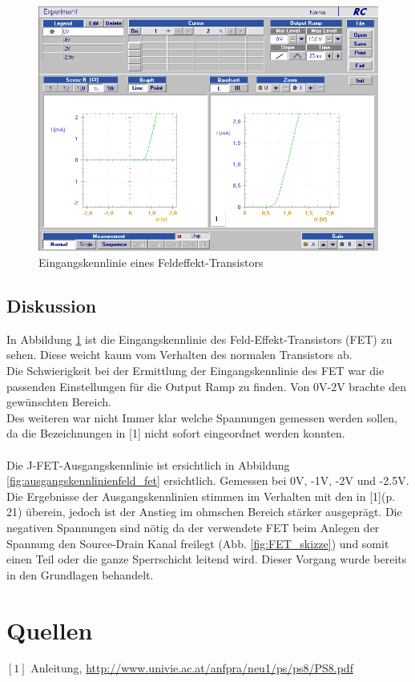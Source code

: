 \documentclass[12pt,a4paper]{article}
\begin{document}
\begin{figure}[H]
	\centering
	\includegraphics[scale=0.45]{./data/Braun_Kurz_PS8/FET_Eingangskennlinie.png}
	\caption{Eingangskennlinie eines Feldeffekt-Transistors}
	\label{fig:eingangskennlinien_fet}
\end{figure}

\begin{multicols}{2}

\subsection{Diskussion}
In Abbildung \ref{fig:eingangskennlinien_fet} ist die Eingangskennlinie des Feld-Effekt-Transistors (FET) zu sehen.
Diese weicht kaum vom Verhalten des normalen Transistors ab.\\
Die Schwierigkeit bei der Ermittlung der Eingangskennlinie des FET war die passenden Einstellungen für die Output Ramp zu finden. Von 0V-2V brachte den gewünschten Bereich.\\ 
Des weiteren war nicht Immer klar welche Spannungen gemessen werden sollen, da die Bezeichnungen in [1] nicht sofort eingeordnet werden konnten.\\
\\
Die J-FET-Ausgangskennlinie ist ersichtlich in Abbildung \ref{fig:ausgangskennlinienfeld_fet} ersichtlich. Gemessen bei 0V, -1V, -2V und -2.5V.\\
Die Ergebnisse der Ausgangskennlinien stimmen im Verhalten mit den in [1](p. 21) überein, jedoch ist der Anstieg im ohmschen Bereich stärker ausgeprägt. Die negativen Spannungen sind nötig da der verwendete FET beim Anlegen der Spannung den Source-Drain Kanal freilegt (Abb. \ref{fig:FET_skizze}) und somit einen Teil oder die ganze Sperrschicht leitend wird. Dieser Vorgang wurde bereits in den Grundlagen behandelt.


\section{Quellen}
$[1]$ Anleitung, \url{http://www.univie.ac.at/anfpra/neu1/ps/ps8/PS8.pdf}\\

\end{multicols}
\end{document}
